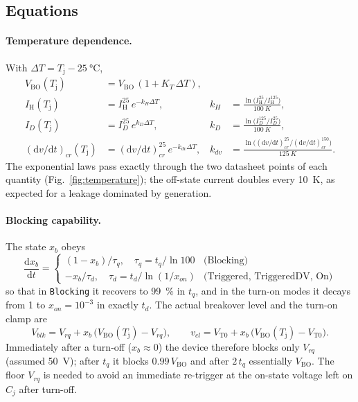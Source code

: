 \documentclass[11pt,a4paper]{article}
\newcommand{\Vbo}{V_{\mathrm{BO}}}
\newcommand{\Ih}{I_{\mathrm{H}}}
\newcommand{\Vto}{V_{\mathrm{T0}}}
\newcommand{\Tj}{T_{\mathrm{j}}}
\newcommand{\dvdt}{\mathrm{d}v/\mathrm{d}t}
\newcommand{\ssc}[1]{\texttt{#1}}
\begin{document}
\subsection{Equations}
\paragraph{Temperature dependence.} With $\Delta T = \Tj - \SI{25}{\celsius}$,
\begin{align}
\Vbo(\Tj) &= \Vbo\,(1 + K_T\,\Delta T) , \label{eq:vbot}\\
\Ih(\Tj)  &= \Ih^{25}\, e^{-k_H \Delta T}, &
k_H &= \frac{\ln\bigl(\Ih^{25}/\Ih^{125}\bigr)}{\SI{100}{K}} , \label{eq:iht}\\
I_D(\Tj)  &= I_D^{25}\, e^{k_D \Delta T}, &
k_D &= \frac{\ln\bigl(I_D^{125}/I_D^{25}\bigr)}{\SI{100}{K}} , \label{eq:idt}\\
(\dvdt)_{cr}(\Tj) &= (\dvdt)_{cr}^{25}\, e^{-k_{dv} \Delta T}, &
k_{dv} &= \frac{\ln\bigl((\dvdt)_{cr}^{25}/(\dvdt)_{cr}^{150}\bigr)}{\SI{125}{K}} . \label{eq:dvdtt}
\end{align}
The exponential laws pass exactly through the two datasheet points of each quantity (Fig.~\ref{fig:temperature}); the off-state current doubles every \SI{10}{K}, as expected for a leakage dominated by generation.

\paragraph{Blocking capability.} The state $x_b$ obeys
\begin{equation}
\frac{\mathrm{d}x_b}{\mathrm{d}t} =
\begin{cases}
(1 - x_b)/\tau_q , \quad \tau_q = t_q/\ln 100 & \text{(Blocking)} \\[2pt]
-x_b/\tau_d , \quad \tau_d = t_d/\ln(1/x_{on}) & \text{(Triggered, TriggeredDV, On)}
\end{cases}
\label{eq:xb}
\end{equation}
so that in \ssc{Blocking} it recovers to \SI{99}{\percent} in $t_q$, and in the turn-on modes it decays from 1 to $x_{on}=10^{-3}$ in exactly $t_d$. The actual breakover level and the turn-on clamp are
\begin{equation}
V_{blk} = V_{rq} + x_b\,\bigl(\Vbo(\Tj) - V_{rq}\bigr), \qquad
v_{cl} = \Vto + x_b\,\bigl(\Vbo(\Tj) - \Vto\bigr) .
\label{eq:vblk}
\end{equation}
Immediately after a turn-off ($x_b\approx 0$) the device therefore blocks only $V_{rq}$ (assumed \SI{50}{V}); after $t_q$ it blocks $0.99\,\Vbo$ and after $2\,t_q$ essentially $\Vbo$. The floor $V_{rq}$ is needed to avoid an immediate re-trigger at the on-state voltage left on $C_j$ after turn-off.
\end{document}
